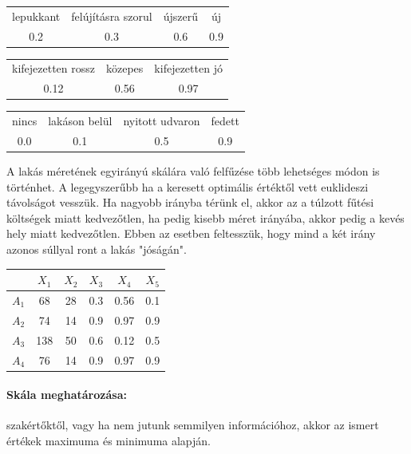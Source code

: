 \documentclass[a4paper,12pt]{article}
\begin{document}
\begin{center}
\begin{tabular}{cccc}
lepukkant& felújításra szorul& újszerű & új \\
0.2 &0.3&0.6&0.9\\
\end{tabular}

\begin{tabular}{ccc}
 kifejezetten rossz& közepes & kifejezetten jó \\
 0.12&0.56&0.97\\
\end{tabular}

\begin{tabular}{cccc}
 nincs & lakáson belül & nyitott udvaron & fedett \\
 0.0 & 0.1 & 0.5 & 0.9 \\
\end{tabular}

\end{center}

A lakás méretének egyirányú skálára való felfűzése több lehetséges módon is történhet. A legegyszerűbb ha a keresett optimális értéktől vett euklideszi távolságot vesszük. Ha nagyobb irányba térünk el, akkor az a túlzott fűtési költségek miatt kedvezőtlen, ha pedig kisebb méret irányába, akkor pedig a kevés hely miatt kedvezőtlen. Ebben az esetben feltesszük, hogy mind a két irány azonos súllyal ront a lakás "jóságán".

\begin{center}
\begin{tabular}{c||c|c|c|c|c}
 & $X_1$& $X_2$& $X_3$& $X_4$& $X_5$ \\
 \hline
 $A_1$&68  &28 & 0.3 & 0.56 & 0.1 \\
 $A_2$&74  &14 & 0.9 & 0.97& 0.9 \\
 $A_3$&138  &50 & 0.6 & 0.12& 0.5 \\
 $A_4$&76  &14 & 0.9 & 0.97& 0.9 \\

\end{tabular}
\end{center}

\paragraph{Skála meghatározása:} szakértőktől, vagy ha nem jutunk semmilyen információhoz, akkor az ismert értékek maximuma és minimuma alapján.
\end{document}
